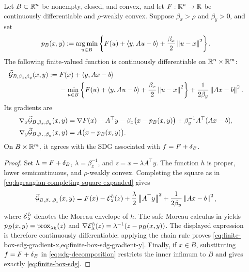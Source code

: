 \begin{proposition}
  \label{prop:finite-box-sdg-extension}
  Let \(B\subset\mathbb{R}^n\) be nonempty, closed, and convex, and let
  \(F:\mathbb{R}^n\to\mathbb{R}\) be continuously differentiable and
  \(\rho\)-weakly convex.  Suppose \(\beta_x>\rho\) and
  \(\beta_y>0\), and set
  \begin{equation}
    p_B(x,y)
    :=
    \operatorname*{arg\,min}_{u\in B}
    \left\{
      F(u)+\left\langle y,Au-b\right\rangle
      +\frac{\beta_x}{2}\left\lVert u-x\right\rVert^{2}
    \right\}.
    \label{eq:finite-box-prox}
  \end{equation}
  The following finite-valued function is continuously differentiable on
  \(\mathbb{R}^n\times\mathbb{R}^m\):
  \begin{equation}
    \begin{split}
    \widetilde{\mathcal{G}}_{B,\beta_x,\beta_y}(x,y)
    :={}&F(x)+\left\langle y,Ax-b\right\rangle\\
       &-\min_{u\in B}
        \left\{
          F(u)+\left\langle y,Au-b\right\rangle
          +\frac{\beta_x}{2}\left\lVert u-x\right\rVert^{2}
        \right\}
        +\frac{1}{2\beta_y}\left\lVert Ax-b\right\rVert^{2}.
    \end{split}
    \label{eq:finite-box-sdg}
  \end{equation}
  Its gradients are
  \begin{align}
    \nabla_x\widetilde{\mathcal{G}}_{B,\beta_x,\beta_y}(x,y)
      &=
        \nabla F(x)+A^\top y-\beta_x\bigl(x-p_B(x,y)\bigr)
        +\beta_y^{-1}A^\top(Ax-b),
        \label{eq:finite-box-sdg-gradient-x}\\
    \nabla_y\widetilde{\mathcal{G}}_{B,\beta_x,\beta_y}(x,y)
      &=
        A\bigl(x-p_B(x,y)\bigr).
        \label{eq:finite-box-sdg-gradient-y}
  \end{align}
  On \(B\times\mathbb{R}^m\), it agrees with the SDG associated with
  \(f=F+\delta_B\).
\end{proposition}

\begin{proof}
  Set \(h=F+\delta_B\), \(\lambda=\beta_x^{-1}\), and
  \(z=x-\lambda A^\top y\).  The function \(h\) is proper, lower
  semicontinuous, and \(\rho\)-weakly convex.  Completing the square as in
  \cref{eq:lagrangian-completing-square-expanded} gives
  \[
    \widetilde{\mathcal{G}}_{B,\beta_x,\beta_y}(x,y)
    =F(x)-\mathcal{E}_\lambda^{h}(z)
      +\frac{\lambda}{2}\left\lVert A^\top y\right\rVert^2
      +\frac{1}{2\beta_y}\left\lVert Ax-b\right\rVert^2,
  \]
  where \(\mathcal{E}_\lambda^{h}\) denotes the Moreau envelope of \(h\).
  The safe Moreau calculus in  yields
  \(p_B(x,y)=\operatorname{prox}_{\lambda h}(z)\) and
  \(\nabla\mathcal{E}_\lambda^{h}(z)=\lambda^{-1}(z-p_B(x,y))\).
  The displayed expression is therefore continuously differentiable;
  applying the chain rule proves
  \cref{eq:finite-box-sdg-gradient-x,eq:finite-box-sdg-gradient-y}.
  Finally, if \(x\in B\), substituting \(f=F+\delta_B\) in
  \cref{eq:sdg-decomposition} restricts the inner infimum to \(B\) and gives
  exactly \cref{eq:finite-box-sdg}.
\end{proof}

